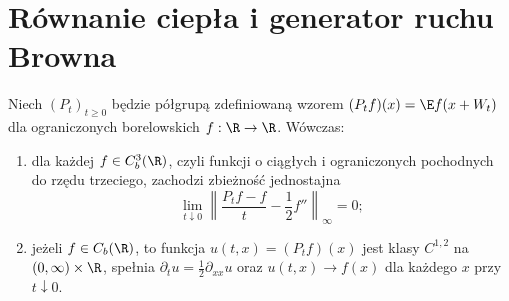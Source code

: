 \section{Równanie ciepła i generator ruchu Browna}
\begin{twierdzenie}
Niech $(P_t)_{t\ge0}$ będzie półgrupą zdefiniowaną wzorem
$(P_tf)(x)=\E f(x+W_t)$ dla ograniczonych borelowskich
$f:\R\to\R$. Wówczas:
\begin{enumerate}
\item dla każdej $f\in C_b^3(\R)$, czyli funkcji o
ciągłych i ograniczonych pochodnych do rzędu trzeciego,
zachodzi zbieżność jednostajna
\[
\lim_{t\downarrow0}
\left\|\frac{P_tf-f}{t}-\frac12 f''\right\|_\infty=0;
\]
\item jeżeli $f\in C_b(\R)$, to funkcja
$u(t,x)=(P_tf)(x)$ jest klasy $C^{1,2}$ na
$(0,\infty)\times\R$, spełnia
$\partial_tu=\frac12\partial_{xx}u$
oraz $u(t,x)\to f(x)$ dla każdego $x$ przy $t\downarrow0$.
\end{enumerate}
\end{twierdzenie}
